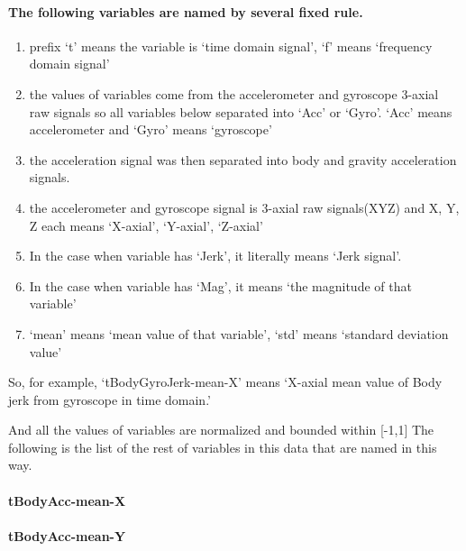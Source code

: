 \documentclass[
]{article}
\providecommand{\tightlist}{%
  \setlength{\itemsep}{0pt}\setlength{\parskip}{0pt}}
\begin{document}
\hypertarget{the-following-variables-are-named-by-several-fixed-rule.}{%
\paragraph{The following variables are named by several fixed
rule.}\label{the-following-variables-are-named-by-several-fixed-rule.}}

\begin{enumerate}
\def\labelenumi{\arabic{enumi}.}
\tightlist
\item
  prefix `t' means the variable is `time domain signal', `f' means
  `frequency domain signal'
\item
  the values of variables come from the accelerometer and gyroscope
  3-axial raw signals so all variables below separated into `Acc' or
  `Gyro'. `Acc' means accelerometer and `Gyro' means `gyroscope'
\item
  the acceleration signal was then separated into body and gravity
  acceleration signals.
\item
  the accelerometer and gyroscope signal is 3-axial raw signals(XYZ) and
  X, Y, Z each means `X-axial', `Y-axial', `Z-axial'
\item
  In the case when variable has `Jerk', it literally means `Jerk
  signal'.
\item
  In the case when variable has `Mag', it means `the magnitude of that
  variable'
\item
  `mean' means `mean value of that variable', `std' means `standard
  deviation value'
\end{enumerate}

So, for example, `tBodyGyroJerk-mean-X' means `X-axial mean value of
Body jerk from gyroscope in time domain.'

And all the values of variables are normalized and bounded within
{[}-1,1{]} The following is the list of the rest of variables in this
data that are named in this way.

\hypertarget{tbodyacc-mean-x}{%
\paragraph{tBodyAcc-mean-X}\label{tbodyacc-mean-x}}

\hypertarget{tbodyacc-mean-y}{%
\paragraph{tBodyAcc-mean-Y}\label{tbodyacc-mean-y}}
\end{document}
